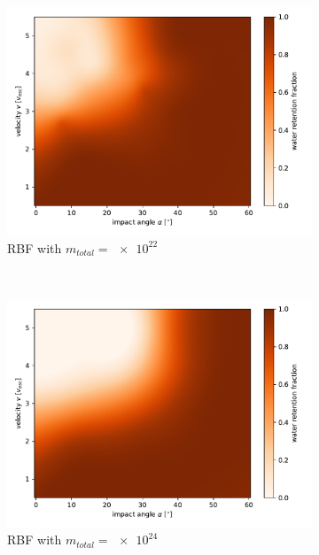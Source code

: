 \begin{figure}
\begin{subfigure}[t]{0.5\textwidth}
	\centering
	\includegraphics[width=\linewidth]{images/plots/mass_rbf1.pdf}
	\caption{RBF with $m_{total}=\num{e22}$}
	\label{fig:mass_rbf1}
\end{subfigure}%
~ 
\begin{subfigure}[t]{0.5\textwidth}
	\centering
	\includegraphics[width=\linewidth]{images/plots/mass_rbf2.pdf}
	\caption{RBF with $m_{total}=\num{e24}$}
	\label{fig:mass_rbf2}
\end{subfigure}
~ 
\begin{subfigure}[t]{0.5\textwidth}
	\centering

\end{subfigure}
\end{figure}
